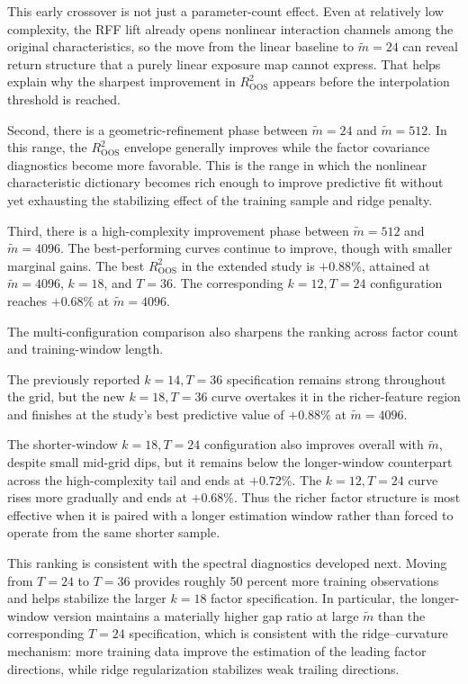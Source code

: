\documentclass[11pt,letterpaper]{article}
\begin{document}
This early crossover is not just a parameter-count effect. Even at relatively
low complexity, the RFF lift already opens nonlinear interaction channels
among the original characteristics, so the move from the linear baseline to
$\tilde m=24$ can reveal return structure that a purely linear exposure map
cannot express. That helps explain why the sharpest improvement in
$R^2_{\mathrm{OOS}}$ appears before the interpolation threshold is reached.

Second, there is a geometric-refinement phase between $\tilde m=24$ and
$\tilde m=512$. In this range, the $R^2_{\mathrm{OOS}}$ envelope generally
improves while the factor covariance diagnostics become more favorable. This is
the range in which the nonlinear characteristic dictionary becomes rich enough
to improve predictive fit without yet exhausting the stabilizing effect of the
training sample and ridge penalty.

Third, there is a high-complexity improvement phase between $\tilde m=512$ and
$\tilde m=4096$. The best-performing curves continue to improve, though with
smaller marginal gains. The best $R^2_{\mathrm{OOS}}$ in the extended study is
$+0.88\%$, attained at $\tilde m=4096$, $k=18$, and $T=36$. The corresponding
$k=12,T=24$ configuration reaches $+0.68\%$ at $\tilde m=4096$.

The multi-configuration comparison also sharpens the ranking across factor
count and training-window length.

The previously reported $k=14,T=36$ specification remains strong throughout
the grid, but the new $k=18,T=36$ curve overtakes it in the richer-feature
region and finishes at the study's best predictive value of $+0.88\%$ at
$\tilde m=4096$.

The shorter-window $k=18,T=24$ configuration also improves overall with
$\tilde m$, despite small mid-grid dips, but it remains below the longer-window
counterpart across the high-complexity tail and ends at $+0.72\%$. The
$k=12,T=24$ curve rises more gradually and ends at $+0.68\%$. Thus the richer
factor structure is most effective when it is paired with a longer estimation
window rather than forced to operate from the same shorter sample.

This ranking is consistent with the spectral diagnostics developed next.
Moving from $T=24$ to $T=36$ provides roughly 50 percent more training
observations and helps stabilize the larger $k=18$ factor specification. In
particular, the longer-window version maintains a materially higher gap ratio
at large $\tilde m$ than the corresponding $T=24$ specification, which is
consistent with the ridge--curvature mechanism: more training data improve the
estimation of the leading factor directions, while ridge regularization
stabilizes weak trailing directions.
\end{document}
